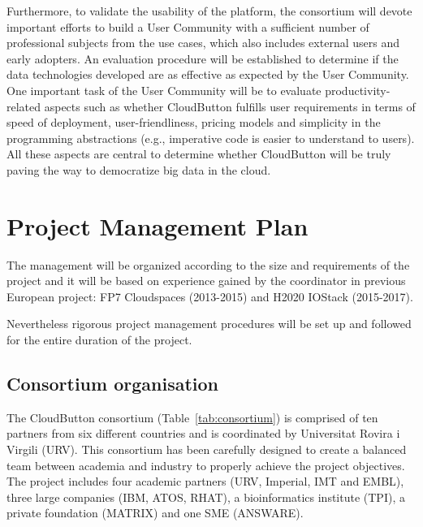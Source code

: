 \documentclass[a4paper,11pt]{article}
\newcommand{\proj}{CloudButton\xspace}
\begin{document}
Furthermore, to validate the usability of the platform, the consortium will devote important efforts to build  a User Community with a sufficient number of professional subjects from the use cases, which also includes external users and early adopters. An evaluation procedure will be established to determine if the data technologies developed are as effective as expected by the User Community. One important task of the User Community will be
to evaluate productivity-related aspects such as whether \proj fulfills user requirements in terms of speed of deployment, user-friendliness, pricing models and simplicity in the programming abstractions (e.g., imperative code is easier to understand to users). All these aspects are central to determine whether \proj will be truly paving the way to democratize big data in the cloud. 

\newpage

\section{Project Management Plan}

The management will be organized according to the size and requirements of the project and it will be based on experience gained by the coordinator in previous European project: FP7 Cloudspaces (2013-2015) and H2020 IOStack (2015-2017).

Nevertheless rigorous project management procedures will be set up and followed for the entire duration of the project. 

\subsection{Consortium organisation}

The \proj consortium (Table~\ref{tab:consortium}) is comprised of ten partners from six different countries and is coordinated by Universitat Rovira i Virgili (URV). 
This consortium has been carefully designed to create a balanced team between academia and industry to properly achieve the project objectives.
The project includes four academic partners (URV, Imperial, IMT and EMBL), three large companies (IBM, ATOS, RHAT), a bioinformatics institute (TPI), a private foundation (MATRIX) and one SME (ANSWARE).
\end{document}
